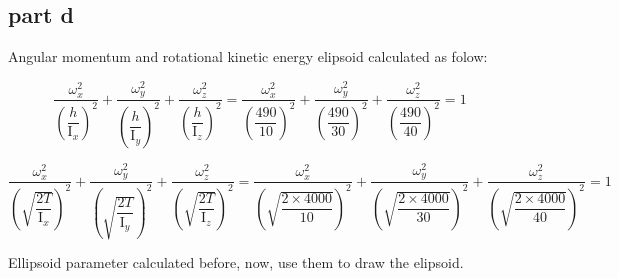 \subsection{part d}

Angular momentum and rotational kinetic energy elipsoid calculated as folow:

\begin{equation}
    \dfrac{\omega_x^2}{\left(\dfrac{h}{\mathrm{I}_x}\right)^2} +
    \dfrac{\omega_y^2}{\left(\dfrac{h}{\mathrm{I}_y}\right)^2} +
    \dfrac{\omega_z^2}{\left(\dfrac{h}{\mathrm{I}_z}\right)^2} =
    \dfrac{\omega_x^2}{\left(\dfrac{490}{10}\right)^2} +
    \dfrac{\omega_y^2}{\left(\dfrac{490}{30}\right)^2} +
    \dfrac{\omega_z^2}{\left(\dfrac{490}{40}\right)^2} =
     1
\end{equation}


\begin{equation}
    \dfrac{\omega_x^2}{\left(\sqrt{\dfrac{2T}{\mathrm{I}_x}}\right)^2} +
    \dfrac{\omega_y^2}{\left(\sqrt{\dfrac{2T}{\mathrm{I}_y}}\right)^2} +
    \dfrac{\omega_z^2}{\left(\sqrt{\dfrac{2T}{\mathrm{I}_z}}\right)^2} =
    \dfrac{\omega_x^2}{\left(\sqrt{\dfrac{2\times 4000}{10}}\right)^2} +
    \dfrac{\omega_y^2}{\left(\sqrt{\dfrac{2\times 4000}{30}}\right)^2} +
    \dfrac{\omega_z^2}{\left(\sqrt{\dfrac{2\times 4000}{40}}\right)^2} = 1
\end{equation}

Ellipsoid parameter calculated before, now, use them to draw the elipsoid.

